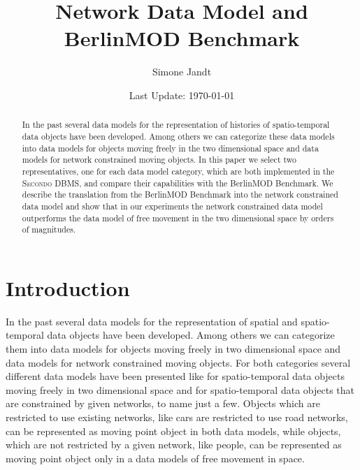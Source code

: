 \documentclass[a4paper]{article}
\title{Network Data Model and BerlinMOD Benchmark}
\author{Simone Jandt}
\date{Last Update: \today}
\newcommand{\secondo}{\textsc{Secondo}}
\newcommand{\bmodb} {BerlinMOD Benchmark}
\begin{document}
\maketitle
\begin{abstract}
In the past several data models for the representation of histories of  spatio-temporal data
objects have been developed. Among others we can categorize these data models
into data models for objects moving freely in the two dimensional space and data
models for network constrained moving objects. In this paper we select two representatives,
one for each data model category, which are both implemented in the \secondo{} DBMS,
and compare their capabilities with the \bmodb{}. We describe the translation
from the \bmodb{} into the network constrained data model and show
that in our experiments the network constrained data model outperforms the data
model of free movement in the two dimensional space by orders of magnitudes.
\end{abstract}
\section{Introduction}
In the past several data models for the representation of spatial and
spatio-temporal data objects have been developed. Among others we can categorize
them into data models for objects moving freely in two dimensional space and
data models for network constrained moving objects. For both categories
several different data models have been presented like
\cite{chenzaniolosqlst,335426} for spatio-temporal data objects moving freely in
two dimensional space and \cite{1146465,956692,VazWolfNetMod} for
spatio-temporal data objects that are constrained by given networks,
to name just a few. Objects which are restricted to use existing networks, like
cars are restricted to use road networks, can be represented as moving point object
in both data
models, while objects, which are not restricted by a given network, like people,
can be represented as moving point object only in a data models of free movement
in space.
\end{document}
